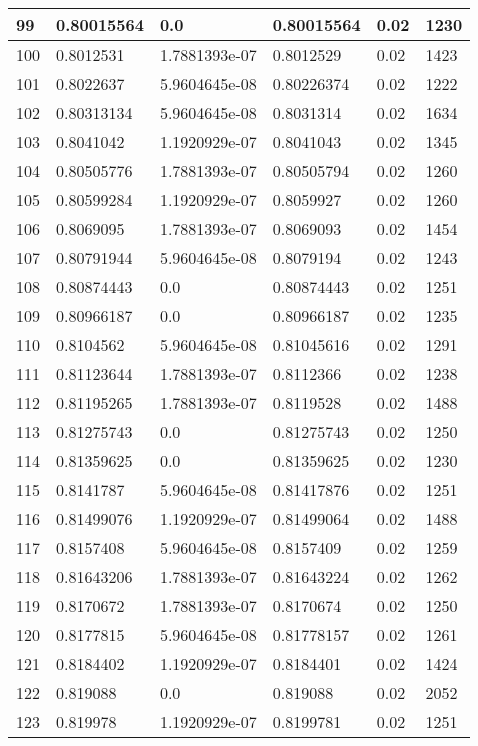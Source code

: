 \begin{longtable}{|l|l|l|l|l|l|}
99 & 0.80015564 & 0.0 & 0.80015564 & 0.02 & 1230 \\ \hline 
100 & 0.8012531 & 1.7881393e-07 & 0.8012529 & 0.02 & 1423 \\ \hline 
101 & 0.8022637 & 5.9604645e-08 & 0.80226374 & 0.02 & 1222 \\ \hline 
102 & 0.80313134 & 5.9604645e-08 & 0.8031314 & 0.02 & 1634 \\ \hline 
103 & 0.8041042 & 1.1920929e-07 & 0.8041043 & 0.02 & 1345 \\ \hline 
104 & 0.80505776 & 1.7881393e-07 & 0.80505794 & 0.02 & 1260 \\ \hline 
105 & 0.80599284 & 1.1920929e-07 & 0.8059927 & 0.02 & 1260 \\ \hline 
106 & 0.8069095 & 1.7881393e-07 & 0.8069093 & 0.02 & 1454 \\ \hline 
107 & 0.80791944 & 5.9604645e-08 & 0.8079194 & 0.02 & 1243 \\ \hline 
108 & 0.80874443 & 0.0 & 0.80874443 & 0.02 & 1251 \\ \hline 
109 & 0.80966187 & 0.0 & 0.80966187 & 0.02 & 1235 \\ \hline 
110 & 0.8104562 & 5.9604645e-08 & 0.81045616 & 0.02 & 1291 \\ \hline 
111 & 0.81123644 & 1.7881393e-07 & 0.8112366 & 0.02 & 1238 \\ \hline 
112 & 0.81195265 & 1.7881393e-07 & 0.8119528 & 0.02 & 1488 \\ \hline 
113 & 0.81275743 & 0.0 & 0.81275743 & 0.02 & 1250 \\ \hline 
114 & 0.81359625 & 0.0 & 0.81359625 & 0.02 & 1230 \\ \hline 
115 & 0.8141787 & 5.9604645e-08 & 0.81417876 & 0.02 & 1251 \\ \hline 
116 & 0.81499076 & 1.1920929e-07 & 0.81499064 & 0.02 & 1488 \\ \hline 
117 & 0.8157408 & 5.9604645e-08 & 0.8157409 & 0.02 & 1259 \\ \hline 
118 & 0.81643206 & 1.7881393e-07 & 0.81643224 & 0.02 & 1262 \\ \hline 
119 & 0.8170672 & 1.7881393e-07 & 0.8170674 & 0.02 & 1250 \\ \hline 
120 & 0.8177815 & 5.9604645e-08 & 0.81778157 & 0.02 & 1261 \\ \hline 
121 & 0.8184402 & 1.1920929e-07 & 0.8184401 & 0.02 & 1424 \\ \hline 
122 & 0.819088 & 0.0 & 0.819088 & 0.02 & 2052 \\ \hline 
123 & 0.819978 & 1.1920929e-07 & 0.8199781 & 0.02 & 1251 \\ \hline 

\end{longtable}
